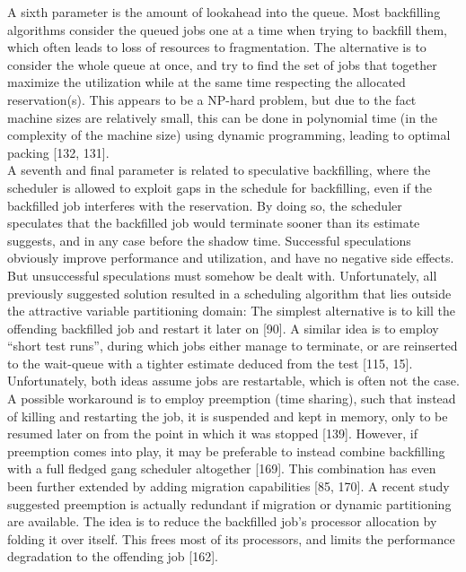 A sixth parameter is the amount of lookahead into the queue. Most backfilling algorithms consider the queued jobs one at a time when trying to backfill them, which often leads to loss of resources to fragmentation. The alternative is to consider the whole queue at once, and try to
find the set of jobs that together maximize the utilization while at the same time respecting the allocated reservation(s). This appears to be a NP-hard problem, but due to the fact machine sizes are relatively small, this can be done in polynomial time (in the complexity of the machine size) using dynamic programming, leading to optimal packing [132, 131].\\

A seventh and final parameter is related to speculative backfilling, where the scheduler is allowed to exploit gaps in the schedule for backfilling, even if the backfilled job interferes with the reservation. By doing so, the scheduler speculates that the backfilled job would terminate sooner than its estimate suggests, and in any case before the shadow time. Successful speculations obviously improve performance and utilization, and have no negative side effects. But unsuccessful speculations must somehow be dealt with. Unfortunately, all previously suggested solution resulted in a scheduling algorithm that lies outside the attractive variable partitioning domain: The simplest alternative is to kill the offending backfilled job and restart it later on [90]. A similar idea is to employ “short test runs”, during which jobs either manage to terminate, or are reinserted to the wait-queue with a tighter estimate deduced from the test [115, 15]. Unfortunately, both ideas assume jobs are restartable, which is often not the case. A possible workaround is to employ preemption (time sharing), such that instead of killing and restarting the job, it is suspended and kept in memory, only to be resumed later on from the point in which it was stopped [139]. However, if preemption comes into play, it may be preferable to instead combine backfilling with a full fledged gang scheduler altogether [169]. This combination has even been further extended by adding migration capabilities [85, 170]. A recent study suggested preemption is actually redundant if migration or dynamic partitioning are available. The idea is to reduce the backfilled job’s processor allocation by folding it over itself. This frees most of its processors, and limits the performance degradation to the offending job [162].\\


